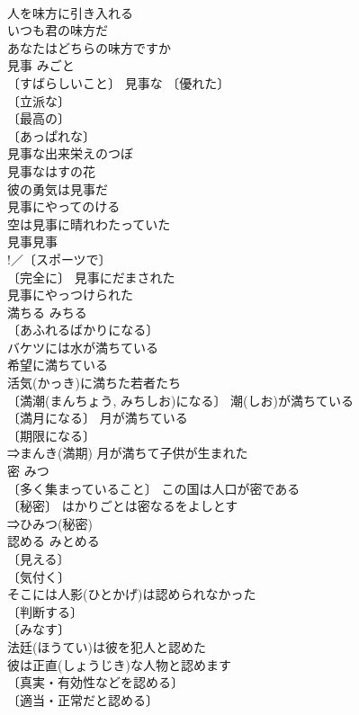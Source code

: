 \documentclass[8pt]{extreport}
\begin{document}
\begin{CJK}{UTF8}{min}
\\	人を味方に引き入れる 
\\	いつも君の味方だ 
\\	あなたはどちらの味方ですか 
\\	見事	みごと	
\\	〔すばらしいこと〕 見事な 〔優れた〕
\\	〔立派な〕
\\	〔最高の〕
\\	〔あっぱれな〕
\\	見事な出来栄えのつぼ 
\\	見事なはすの花 
\\	彼の勇気は見事だ 
\\	見事にやってのける 
\\	空は見事に晴れわたっていた 
\\	見事見事 
\\	!／〔スポーツで〕
\\	〔完全に〕 見事にだまされた 
\\	見事にやっつけられた 
\\	満ちる	みちる	
\\	〔あふれるばかりになる〕
\\	バケツには水が満ちている 
\\	希望に満ちている 
\\	活気(かっき)に満ちた若者たち 
\\	〔満潮(まんちょう, みちしお)になる〕 潮(しお)が満ちている 
\\	〔満月になる〕 月が満ちている 
\\	〔期限になる〕
\\	⇒まんき(満期) 月が満ちて子供が生まれた 
\\	密	みつ	
\\	〔多く集まっていること〕 この国は人口が密である 
\\	〔秘密〕 はかりごとは密なるをよしとす 
\\	⇒ひみつ(秘密)
\\	認める	みとめる	
\\	〔見える〕
\\	〔気付く〕
\\	そこには人影(ひとかげ)は認められなかった 
\\	〔判断する〕
\\	〔みなす〕
\\	法廷(ほうてい)は彼を犯人と認めた 
\\	彼は正直(しょうじき)な人物と認めます 
\\	〔真実・有効性などを認める〕
\\	〔適当・正常だと認める〕

\end{CJK}
\end{document}
